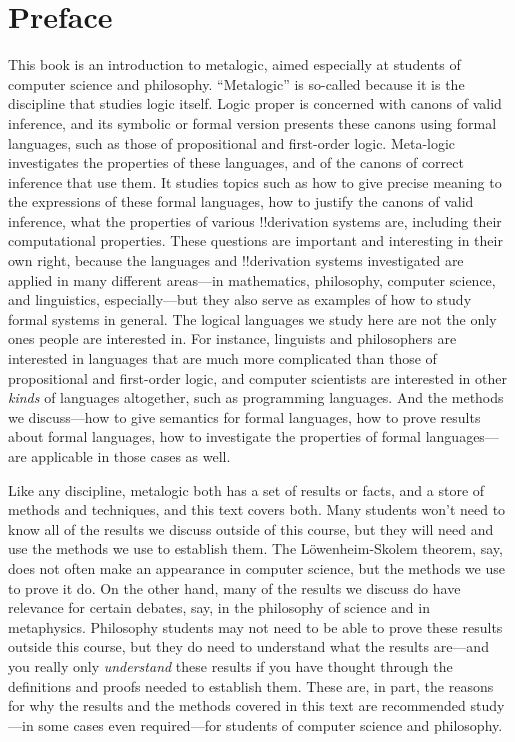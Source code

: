 \chapter{Preface}

This book is an introduction to metalogic, aimed especially at
students of computer science and philosophy. ``Metalogic'' is
so-called because it is the discipline that studies logic itself.
Logic proper is concerned with canons of valid inference, and its
symbolic or formal version presents these canons using formal
languages, such as those of propositional and first-order logic.
Meta-logic investigates the properties of these languages, and of the
canons of correct inference that use them. It studies topics such as
how to give precise meaning to the expressions of these formal
languages, how to justify the canons of valid inference, what the
properties of various !!{derivation} systems are, including their
computational properties. These questions are important and
interesting in their own right, because the languages and
!!{derivation} systems investigated are applied in many different
areas---in mathematics, philosophy, computer science, and linguistics,
especially---but they also serve as examples of how to study formal
systems in general. The logical languages we study here are not the
only ones people are interested in. For instance, linguists and
philosophers are interested in languages that are much more
complicated than those of propositional and first-order logic, and
computer scientists are interested in other \emph{kinds} of languages
altogether, such as programming languages. And the methods we
discuss---how to give semantics for formal languages, how to prove
results about formal languages, how to investigate the properties of
formal languages---are applicable in those cases as well.

Like any discipline, metalogic both has a set of results or facts,
and a store of methods and techniques, and this text covers both.
Many students won't need to know all of the results we discuss
outside of this course, but they will need and use the methods we use
to establish them. The L\"owenheim-Skolem theorem, say, does not
often make an appearance in computer science, but the methods we use
to prove it do. On the other hand, many of the results we discuss do
have relevance for certain debates, say, in the philosophy of science
and in metaphysics. Philosophy students may not need to be able to
prove these results outside this course, but they do need to
understand what the results are---and you really only
\emph{understand} these results if you have thought through the
definitions and proofs needed to establish them. These are, in part,
the reasons for why the results and the methods covered in this text
are recommended study---in some cases even required---for students of
computer science and philosophy.

